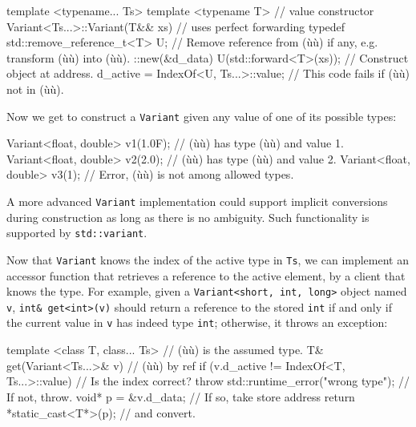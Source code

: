 \begin{emcppslisting}
template <typename... Ts>
template <typename T>                       // value constructor
Variant<Ts...>::Variant(T&& xs)             // uses perfect forwarding
{
    typedef std::remove_reference_t<T> U;
        // Remove reference from (ù{}ù) if any, e.g. transform (ù{}ù) into (ù{}ù).
    ::new(&d_data) U(std::forward<T>(xs));  // Construct object at address.
    d_active = IndexOf<U, Ts...>::value;    // This code fails if (ù{}ù) not in (ù{}ù).
}
\end{emcppslisting}
    

\noindent Now we get to construct a \lstinline!Variant! given any value of one of its
possible types:

\begin{emcppslisting}
Variant<float, double> v1(1.0F);  // (ù{}ù) has type (ù{}ù) and value 1.
Variant<float, double> v2(2.0);   // (ù{}ù) has type (ù{}ù) and value 2.
Variant<float, double> v3(1);     // Error, (ù{}ù) is not among allowed types.
\end{emcppslisting}
    

\noindent A more advanced \lstinline!Variant! implementation could support implicit
conversions during construction as long as there is no ambiguity. Such
functionality is supported by \lstinline!std::variant!.

Now that \lstinline!Variant! knows the index of the active type in
\lstinline!Ts!, we can implement an accessor function that retrieves a
reference to the active element, by a client that knows the type. For
example, given a \lstinline!Variant<short,!~\lstinline!int,!~\lstinline!long>!
object named \lstinline!v!, \lstinline!int&!~\lstinline!get<int>(v)! should
return a reference to the stored \lstinline!int! if and only if the current
value in \lstinline!v! has indeed type \lstinline!int!; otherwise, it throws
an exception:

\begin{emcppslisting}
template <class T, class... Ts>                  // (ù{}ù) is the assumed type.
T& get(Variant<Ts...>& v)                        // (ù{}ù) by ref
{
    if (v.d_active != IndexOf<T, Ts...>::value)  // Is the index correct?
        throw std::runtime_error("wrong type");  // If not, throw.
    void* p = &v.d_data;                         // If so, take store address
    return *static_cast<T*>(p);                  // and convert.
}
\end{emcppslisting}
    


